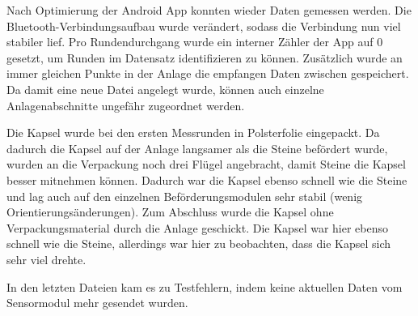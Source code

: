 Nach Optimierung der Android App konnten wieder Daten gemessen werden. Die Bluetooth-Verbindungsaufbau wurde verändert, sodass die Verbindung nun viel stabiler lief. Pro Rundendurchgang wurde ein interner Zähler der App auf 0 gesetzt, um Runden im Datensatz identifizieren zu können. Zusätzlich wurde an immer gleichen Punkte in der Anlage die empfangen Daten zwischen gespeichert. Da damit eine neue Datei angelegt wurde, können auch einzelne Anlagenabschnitte ungefähr zugeordnet werden.

Die Kapsel wurde bei den ersten Messrunden in Polsterfolie eingepackt. Da dadurch die Kapsel auf der Anlage langsamer als die Steine befördert wurde, wurden an die Verpackung noch drei Flügel angebracht, damit Steine die Kapsel besser mitnehmen können. Dadurch war die Kapsel ebenso schnell wie die Steine und lag auch auf den einzelnen Beförderungsmodulen sehr stabil (wenig Orientierungsänderungen). Zum Abschluss wurde die Kapsel ohne Verpackungsmaterial durch die Anlage geschickt. Die Kapsel war hier ebenso schnell wie die Steine, allerdings war hier zu beobachten, dass die Kapsel sich sehr viel drehte. 

In den letzten Dateien kam es zu Testfehlern, indem keine aktuellen Daten vom Sensormodul mehr gesendet wurden.

